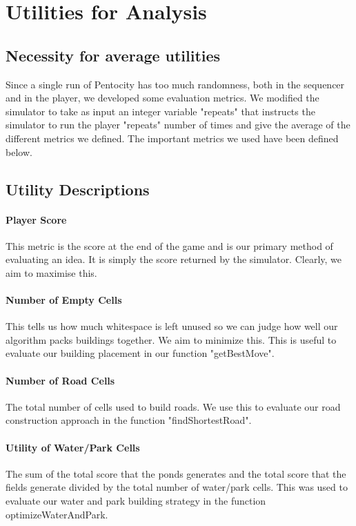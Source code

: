 \section{Utilities for Analysis}
\subsection{Necessity for average utilities}
Since a single run of Pentocity has too much randomness, both in the sequencer and in the player, we developed some evaluation metrics. We modified the simulator to take as input an integer variable "repeats" that instructs the simulator to run the player "repeats" number of times and give the average of the different metrics we defined. The important metrics we used have been defined below.

\subsection{Utility Descriptions}
\paragraph{Player Score} 
This metric is the score at the end of the game and is our primary method of evaluating an idea. It is simply the score returned by the simulator. Clearly, we aim to maximise this.
\paragraph{Number of Empty Cells} 
    This tells us how much whitespace is left unused so we can judge how well our algorithm packs buildings together. We aim to minimize this. This is useful to evaluate our building placement in our function "getBestMove".
\paragraph{Number of Road Cells} 
    The total number of cells used to build roads. We use this to evaluate our road construction approach in the function "findShortestRoad".
\paragraph{Utility of Water/Park Cells} 
    The sum of the total score that the ponds generates and the total score that the fields generate divided by the total number of water/park cells. This was used to evaluate our water and park building strategy in the function optimizeWaterAndPark.

